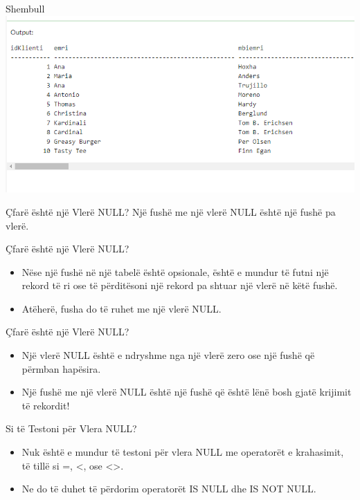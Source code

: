 \documentclass[
  ignorenonframetext,
]{beamer}
\begin{document}
\begin{frame}{Shembull}
\label{shembull-7}
\includegraphics{./Figs/query32.png}
\end{frame}

\begin{frame}{Çfarë është një Vlerë NULL?}
\label{uxe7faruxeb-uxebshtuxeb-njuxeb-vleruxeb-null}
Një fushë me një vlerë NULL është një fushë pa vlerë.
\end{frame}

\begin{frame}{Çfarë është një Vlerë NULL?}
\label{uxe7faruxeb-uxebshtuxeb-njuxeb-vleruxeb-null-1}
\begin{itemize}
\item
  Nëse një fushë në një tabelë është opsionale, është e mundur të futni
  një rekord të ri ose të përditësoni një rekord pa shtuar një vlerë në
  këtë fushë.
\item
  Atëherë, fusha do të ruhet me një vlerë NULL.
\end{itemize}
\end{frame}

\begin{frame}{Çfarë është një Vlerë NULL?}
\label{uxe7faruxeb-uxebshtuxeb-njuxeb-vleruxeb-null-2}
\begin{itemize}
\item
  Një vlerë NULL është e ndryshme nga një vlerë zero ose një fushë që
  përmban hapësira.
\item
  Një fushë me një vlerë NULL është një fushë që është lënë bosh gjatë
  krijimit të rekordit!
\end{itemize}
\end{frame}

\begin{frame}{Si të Testoni për Vlera NULL?}
\label{si-tuxeb-testoni-puxebr-vlera-null}
\begin{itemize}
\item
  Nuk është e mundur të testoni për vlera NULL me operatorët e
  krahasimit, të tillë si =, \textless, ose \textless\textgreater.
\item
  Ne do të duhet të përdorim operatorët IS NULL dhe IS NOT NULL.
\end{itemize}
\end{frame}
\end{document}
